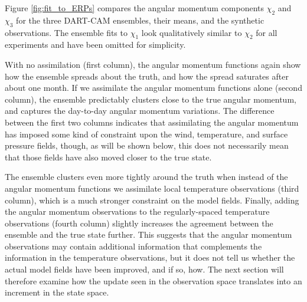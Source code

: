 Figure \ref{fig:fit_to_ERPs} compares the angular momentum components $\chi_2$ and $\chi_3$ for the three DART-CAM ensembles, their means, and the synthetic observations.
The ensemble fits to $\chi_1$ look qualitatively similar to $\chi_2$ for all experiments and have been omitted for simplicity. 

With no assimilation (first column), the angular momentum functions again show how the ensemble spreads about the truth, and how the spread saturates after about one month.
If we assimilate the angular momentum functions alone (second column), the ensemble predictably clusters close to the true angular momentum, and captures the day-to-day angular momentum variations. 
The difference between the first two columns indicates that assimilating the angular momentum has imposed some kind of constraint upon the wind, temperature, and surface pressure fields, though, as will be shown below, this does not necessarily mean that those fields have also moved closer to the true state. 

The ensemble clusters even more tightly around the truth when instead of the angular momentum functions we assimilate local temperature observations (third column), which is a much stronger constraint on the model fields. 
Finally, adding the angular momentum observations to the regularly-spaced temperature observations (fourth column) slightly increases the agreement between the ensemble and the true state further.  
This suggests that the angular momentum observations may contain additional information that complements the information in the temperature observations, but it does not tell us whether the actual model fields have been improved, and if so, how. 
The next section will therefore examine how the update seen in the observation space translates into an increment in the state space. 
